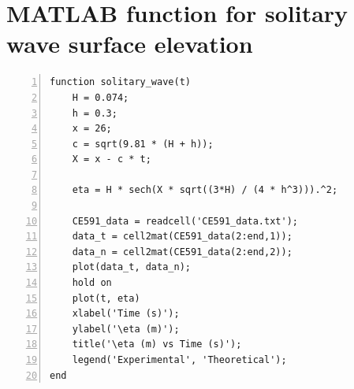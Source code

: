 \documentclass[a4paper]{article}
\begin{document}
\section*{\small MATLAB function for solitary wave surface elevation}
\begin{lstlisting}[frame=single, numbers=left, style=Matlab-Pyglike]
function solitary_wave(t)
    H = 0.074;
    h = 0.3;
    x = 26;
    c = sqrt(9.81 * (H + h));
    X = x - c * t;

    eta = H * sech(X * sqrt((3*H) / (4 * h^3))).^2;

    CE591_data = readcell('CE591_data.txt');
    data_t = cell2mat(CE591_data(2:end,1));
    data_n = cell2mat(CE591_data(2:end,2));
    plot(data_t, data_n);
    hold on
    plot(t, eta)
    xlabel('Time (s)');
    ylabel('\eta (m)');
    title('\eta (m) vs Time (s)');
    legend('Experimental', 'Theoretical');
end
\end{lstlisting}
\end{document}

